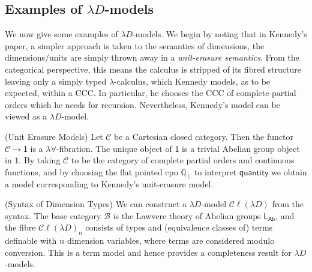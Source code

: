 \documentclass[a4paper,UKenglish]{lipics}
\newcommand{\ra}{\rightarrow}
\newcommand{\msf}[1]{\mathsf{#1}} %
\newcommand{\LAb}{\msf{L}_{\msf{Ab}}}
\newcommand{\terminal}{\msf{1}}
\newcommand{\ClLD}{\mathcal{C\ell}(\lambda{}D)} %
\newcommand{\B}{\mathcal{B}}
\newcommand{\C}{\mathcal{C}}
\newcommand{\bbQ}{\mathbb{Q}}
\newcommand{\qnt}{\msf{quantity}}
\begin{document}
\subsection{Examples of $\lambda D$-models}
We now give some examples of $\lambda D$-models. We begin by noting that in Kennedy's paper, a simpler approach is taken to the semantics of dimensions, the dimensions/units are simply thrown away in a {\em unit-erasure semantics}. From the categorical perspective, this means the calculus is stripped of its fibred structure leaving only a simply typed $\lambda$-calculus, which Kennedy models, as to be expected, within a CCC. In particular, he chooses the CCC of complete partial orders which he needs for recursion. Nevertheless, Kennedy's model can be viewed as a $\lambda D$-model.

\begin{example}(Unit Erasure Models)
\label{ex:UnitErasure}
Let $\C$ be a Cartesian closed category. Then the functor $\C \ra \terminal$ is a $\lambda\forall$-fibration. The unique object of $\terminal$ is a trivial Abelian group object in $\terminal$. By taking $\C$ to be the category of complete partial orders and continuous functions, and by choosing the flat pointed cpo $\bbQ_{\bot}$ to interpret $\qnt$ we obtain a model corresponding to Kennedy's unit-erasure model.
\end{example}


\begin{example}(Syntax of Dimension Types)
We can construct a $\lambda D$-model $\ClLD$ from the syntax. The base category $\B$ is the Lawvere theory of Abelian groups $\LAb$, and the fibre $\ClLD_n$ consists of types and (equivalence classes of) terms definable with $n$ dimension variables, where terms are considered modulo conversion. This is a term model and hence provides a completeness result for $\lambda D$-models.
\end{example}
\end{document}
